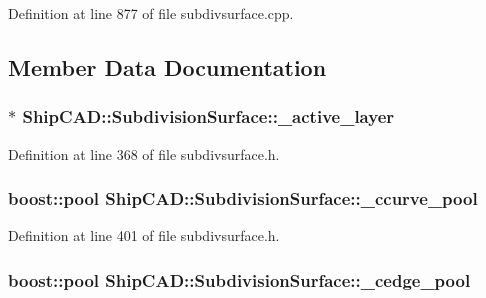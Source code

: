 Definition at line 877 of file subdivsurface.\-cpp.



\subsection{Member Data Documentation}
\hypertarget{classShipCAD_1_1SubdivisionSurface_aef766e0b62189247c0f3214c56800040}{
\subsubsection[{\-\_\-active\-\_\-layer}]{$\ast$ Ship\-C\-A\-D\-::\-Subdivision\-Surface\-::\-\_\-active\-\_\-layer\hspace{0.3cm}{\ttfamily [protected]}}}\label{classShipCAD_1_1SubdivisionSurface_aef766e0b62189247c0f3214c56800040}


Definition at line 368 of file subdivsurface.\-h.

\hypertarget{classShipCAD_1_1SubdivisionSurface_ae20f94c83bac02bae90a905379765b0a}{
\subsubsection[{\-\_\-ccurve\-\_\-pool}]{\setlength{\rightskip}{0pt plus 5cm}boost\-::pool Ship\-C\-A\-D\-::\-Subdivision\-Surface\-::\-\_\-ccurve\-\_\-pool\hspace{0.3cm}{\ttfamily [protected]}}}\label{classShipCAD_1_1SubdivisionSurface_ae20f94c83bac02bae90a905379765b0a}


Definition at line 401 of file subdivsurface.\-h.

\hypertarget{classShipCAD_1_1SubdivisionSurface_a413da68890d958a7994d09e0906be102}{
\subsubsection[{\-\_\-cedge\-\_\-pool}]{\setlength{\rightskip}{0pt plus 5cm}boost\-::pool Ship\-C\-A\-D\-::\-Subdivision\-Surface\-::\-\_\-cedge\-\_\-pool\hspace{0.3cm}{\ttfamily [protected]}}}\label{classShipCAD_1_1SubdivisionSurface_a413da68890d958a7994d09e0906be102}


